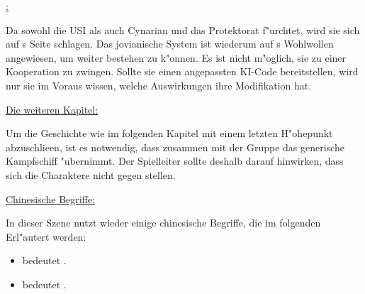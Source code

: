 \begin{remarks}	
	\underline{\ml{}:}

	Da \ml{} sowohl die USI als auch Cynarian und das Protektorat f"urchtet, wird sie sich auf \xl{}s Seite schlagen. Das jovianische System ist wiederum auf \ml{}s Wohlwollen angewiesen, um weiter bestehen zu k"onnen. Es ist nicht m"oglich, sie zu einer Kooperation zu zwingen. Sollte sie einen angepassten KI-Code bereitstellen, wird nur sie im Voraus wissen, welche Auswirkungen ihre Modifikation hat.

	\underline{Die weiteren Kapitel:}

	Um die Geschichte wie im folgenden Kapitel mit einem letzten H"ohepunkt abzuschlie\3en, ist es notwendig, dass \xl{} zusammen mit der Gruppe das generische Kampfschiff "ubernimmt. Der Spielleiter sollte deshalb darauf hinwirken, dass sich die Charaktere nicht gegen \xl{} stellen.

	\underline{Chinesische Begriffe:}

	In dieser Szene nutzt \xl{} wieder einige chinesische Begriffe, die im folgenden Erl"autert werden:

	\begin{itemize}
		\item {} bedeutet .
		\item {} bedeutet .		
	\end{itemize}
	 
\end{remarks}
